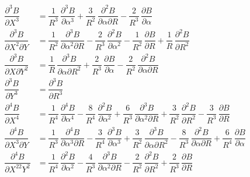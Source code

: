 {\renewcommand{\arraystretch}{2}
 \begin{equation}
	 \begin{array}{ll}
		 \dfrac{ \partial^3 B }{ \partial X^3} 
		     & =  \dfrac{ 1}{R^3} \, \dfrac{\partial^3 B}{\partial \alpha^3} 
		       + \dfrac{3 }{R^2} \, \dfrac{\partial^2 B }{\partial \alpha \partial R} 
		       - \dfrac{2 }{ R^3} \, \dfrac{\partial B }{ \partial \alpha}\\  %
		 \dfrac{\partial^3 B }{ \partial X^2\partial Y} 
		     & =  \dfrac{1 }{ R^2} \, \dfrac{\partial^3 B }{\partial \alpha^ 2\partial R}
		       - \dfrac{2 }{ R^3} \, \dfrac{\partial^2 B }{ \partial \alpha^2} 
		       - \dfrac{1}{R^2} \, \dfrac{\partial B }{ \partial R} 
		       + \dfrac{1 }{ R} \, \dfrac{\partial^2 B }{ \partial R^2} \\  %
		 \dfrac{ \partial^3 B }{ \partial X\partial Y^2} 
		     & =  \dfrac{ 1 }{ R} \, \dfrac{\partial^3 B }{ \partial \alpha \partial R^2} 
		       + \dfrac{2 }{ R^3} \, \dfrac{\partial B }{\partial \alpha}  
		       - \dfrac{2 }{R^2} \, \dfrac{\partial^ 2B }{ \partial \alpha \partial R} \\ %
		 \dfrac{ \partial^3 B }{ \partial Y^3}
		     & =  \dfrac{ \partial^3 B }{ \partial R^3} \\ %
		\dfrac{\partial^4 B }{ \partial X^4}
		     & = \dfrac{ 1}{ R^4} \, \dfrac{\partial^4 B }{ \partial \alpha^4} 
		       - \dfrac{8 }{ R^4} \, \dfrac{\partial^2 B }{ \partial \alpha^2} 
		       + \dfrac{6 }{ R^3} \, \dfrac{\partial^3 B }{ \partial\alpha^2\partial R} 
		       + \dfrac{3 }{ R^2} \, \dfrac{\partial^2 B }{ \partial R^2} 
		       - \dfrac{3}{ R^3} \, \dfrac{\partial B }{ \partial R} \\ %
	     \dfrac{ \partial^4 B }{ \partial X^3\partial Y}
	         & =   \dfrac{ 1 }{ R^3} \, \dfrac{\partial^ 4B }{\partial \alpha^ 3\partial R} 
	           - \dfrac{3 }{ R^4} \, \dfrac{\partial^ 3B }{ \partial\alpha^ 3} 
	           + \dfrac{3 }{ R^2} \, \dfrac{\partial^3 B }{ \partial \alpha \partial R^2} 
	           - \dfrac{8 }{ R^3} \, \dfrac{\partial^2 B }{ \partial \alpha \partial R} 
	           + \dfrac{6 }{ R^4} \, \dfrac{\partial B }{ \partial \alpha} \\   %
	    \dfrac{ \partial^4 B}{ \partial X^22 Y^2} 
	         & =  \dfrac{ 1 }{ R^4} \, \dfrac{\partial^2 B }{ \partial \alpha^ 2} 
	           - \dfrac{4 }{ R^3} \, \dfrac{\partial^3 B }{ \partial \alpha^ 2\partial R} 
	           - \dfrac{2 }{ R^2} \, \dfrac{\partial^2 B }{ \partial R^2} 
	           + \dfrac{2 }{ R^3} \, \dfrac{\partial B }{ \partial R} 

\end{array}
\end{equation}}
